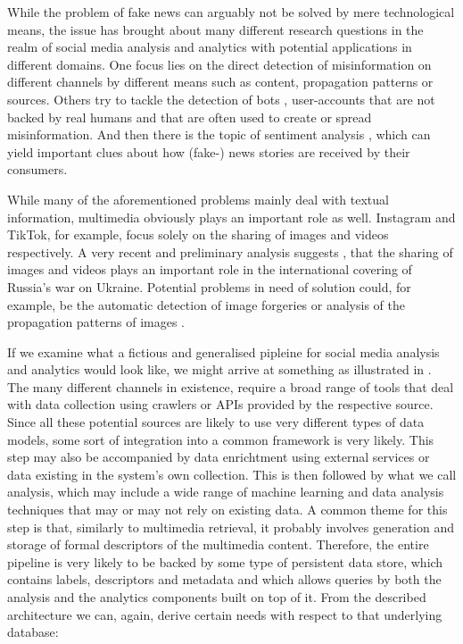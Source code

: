 While the problem of fake news can arguably not be solved by mere technological means, the issue has brought about many different research questions in the realm of social media analysis and analytics with potential applications in different domains. One focus lies on the direct detection of misinformation on different channels by different means such as content, propagation patterns \cite{Zhou:2020Survey} or sources. Others try to tackle the detection of bots \cite{Davis:2016BotOrNot,Cresci:2020Decade}, user-accounts that are not backed by real humans and that are often used to create or spread misinformation. And then there is the topic of sentiment analysis \cite{Yue:2019Survey}, which can yield important clues about how (fake-) news stories are received by their consumers.

While many of the aforementioned problems mainly deal with textual information, multimedia obviously plays an important role as well. Instagram and TikTok, for example, focus solely on the sharing of images and videos respectively. A very recent and preliminary analysis suggests \cite{Ciuriak:2022Role}, that the sharing of images and videos plays an important role in the international covering of Russia's war on Ukraine. Potential problems in need of solution could, for example, be the automatic detection of image forgeries \cite{Farid:2009Image} or analysis of the propagation patterns of images \cite{Zannettou:2018Origins}.

If we examine what a fictious and generalised pipleine for social media analysis and analytics would look like, we might arrive at something as illustrated in  \cite{Zhu2015:Multimedia,Cui:2019Defend,Yang:2019XFake,Bagade:2020Kauwa}. The many different channels in existence, require a broad range of tools that deal with data collection using crawlers or APIs provided by the respective source. Since all these potential sources are likely to use very different types of data models, some sort of integration into a common framework is very likely. This step may also be accompanied by data enrichtment using external services or data existing in the system's own collection. This is then followed by what we call analysis, which may include a wide range of machine learning and data analysis techniques that may or may not rely on existing data. A common theme for this step is that, similarly to multimedia retrieval, it probably involves generation and storage of formal descriptors of the multimedia content. Therefore, the entire pipeline is very likely to be backed by some type of persistent data store, which contains labels, descriptors and metadata and which allows queries by both the analysis and the analytics components built on top of it. From the described architecture we can, again, derive certain needs with respect to that underlying database: 

